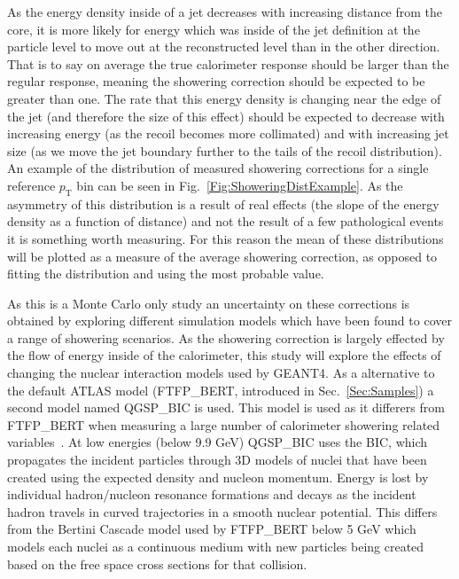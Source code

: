 As the energy density inside of a jet decreases with increasing distance from the core, it is more likely for energy which was inside of the jet definition at the particle level to move out at the reconstructed level than in the other direction.  
That is to say on average the true calorimeter response should be larger than the regular response, meaning the showering correction should be expected to be greater than one.  
The rate that this energy density is changing near the edge of the jet (and therefore the size of this effect) should be expected to decrease with increasing energy (as the recoil becomes more collimated) and with increasing jet size (as we move the jet boundary further to the tails of the recoil distribution).  
An example of the distribution of measured showering corrections for a single reference $p_{\mathrm T}$ bin can be seen in Fig.~\ref{Fig:ShoweringDistExample}.  
As the asymmetry of this distribution is a result of real effects (the slope of the energy density as a function of distance) and not the result of a few pathological events it is something worth measuring.  
For this reason the mean of these distributions will be plotted as a measure of the average showering correction, as opposed to fitting the distribution and using the most probable value.  

As this is a Monte Carlo only study an uncertainty on these corrections is obtained by exploring different simulation models which have been found to cover a range of showering scenarios.  
As the showering correction is largely effected by the flow of energy inside of the calorimeter, this study will explore the effects of changing the nuclear interaction models used by GEANT4.  
As a alternative to the default ATLAS model (FTFP\_BERT, introduced in Sec.~\ref{Sec:Samples}) a second model named QGSP\_BIC is used.  
This model is used as it differers from FTFP\_BERT when measuring a large number of calorimeter showering related variables~\cite{Zhang:2253040}.  
At low energies (below 9.9 GeV) QGSP\_BIC uses the \gls{BIC}, which propagates the incident particles through 3D models of nuclei that have been created using the expected density and nucleon momentum.  
Energy is lost by individual hadron/nucleon resonance formations and decays as the incident hadron travels in curved trajectories in a smooth nuclear potential.  
This differs from the Bertini Cascade model used by FTFP\_BERT below 5 GeV which models each nuclei as a continuous medium with new particles being created based on the free space cross sections for that collision.  

